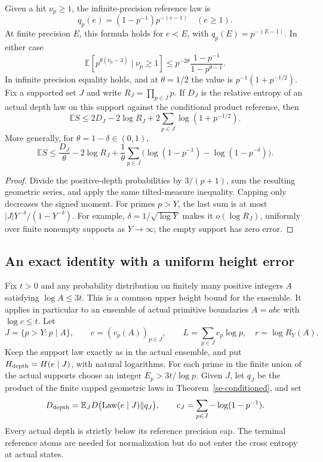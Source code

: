 \begin{theorem}\label{se-conditioned}
Given a hit $\nu_p\ge1$, the infinite-precision reference law is
\[
 q_p(e)=(1-p^{-1})p^{-(e-1)}\quad(e\ge1).
\]
At finite precision $E$, this formula holds for $e<E$, with
$q_p(E)=p^{-(E-1)}$. In either case
\[
 \mathbb E[p^{\theta(\nu_p-3)}\mid\nu_p\ge1]
 \le p^{-2\theta}\frac{1-p^{-1}}{1-p^{\theta-1}}.
\]
In infinite precision equality holds, and at $\theta=1/2$ the value
is $p^{-1}(1+p^{-1/2})$. Fix a supported set $J$ and write
$R_J=\prod_{p\in J}p$. If $D_J$ is the relative entropy of an actual
depth law on this support against the conditional product reference,
then
\[
 \mathbb E S\le2D_J-2\log R_J
                      +2\sum_{p\in J}\log(1+p^{-1/2}).
\]
More generally, for $\theta=1-\delta\in(0,1)$,
\[
 \mathbb E S\le\frac{D_J}{\theta}-2\log R_J
 +\frac1\theta\sum_{p\in J}
       \bigl(\log(1-p^{-1})-\log(1-p^{-\delta})\bigr).
\]
\end{theorem}
\begin{proof}
Divide the positive-depth probabilities by $3/(p+1)$, sum the resulting
geometric series, and apply the same tilted-measure inequality.
Capping only decreases the signed moment. For primes $p>Y$, the last
sum is at most
$|J|Y^{-\delta}/(1-Y^{-\delta})$.
For example, $\delta=1/\sqrt{\log Y}$ makes it $o(\log R_J)$,
uniformly over finite nonempty supports as $Y\to\infty$; the empty
support has zero error.
\end{proof}

\subsection{An exact identity with a uniform height error}
Fix $t>0$ and any probability distribution on finitely many positive
integers $A$ satisfying $\log A\le3t$. This is a common upper height
bound for the ensemble. It applies in particular to an ensemble of
actual primitive boundaries $A=abc$ with $\log c\le t$.
Let
\[
 J=\{p>Y:p\mid A\},\qquad e=(v_p(A))_{p\in J},
 \qquad L=\sum_{p\in J}e_p\log p,\quad r=\log R_Y(A).
\]
Keep the support law exactly as in the actual ensemble, and put
$H_{\rm depth}=H(e\mid J)$, with natural logarithms.
For each prime in the finite union of the actual supports choose an
integer $E_p>3t/\log p$. Given $J$, let $q_J$ be the product of the
finite capped geometric laws in Theorem~\ref{se-conditioned}, and set
\[
 D_{\rm depth}=\mathbb E_J
   D\bigl(\operatorname{Law}(e\mid J)\Vert q_J\bigr),
 \qquad c_J=\sum_{p\in J}-\log(1-p^{-1}).
\]
Every actual depth is strictly below its reference precision cap.
The terminal reference atoms are needed for normalization but do not
enter the cross entropy at actual states.

